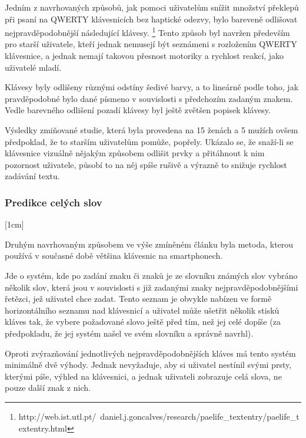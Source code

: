 \documentclass{article}
\begin{document}
Jedním z navrhovaných způsobů, jak pomoci uživatelům snížit množství překlepů při psaní na QWERTY klávesnicích bez haptické odezvy, bylo bareveně odlišovat nejpravděpodobnější následující klávesy. \footnote{http://web.ist.utl.pt/~daniel.j.goncalves/research/paelife\_textentry/paelife\_textentry.html} Tento způsob byl navržen především pro starší uživatele, kteří jednak nemusejí být seznámeni s rozložením QWERTY klávesnice, a jednak nemají takovou přesnost motoriky a rychlost reakcí, jako uživatelé mladí. 

Klávesy byly odlišeny různými odstíny šedivé barvy, a to lineárně podle toho, jak pravděpodobné bylo dané písmeno v souvislosti s předchozím zadaným znakem. Vedle barevného odlišení pozadí klávesy byl ještě zvětšen popisek klávesy.


Výsledky zmiňované studie, která byla provedena na 15 ženách a 5 mužích ovšem předpoklad, že to starším uživatelům pomůže, popřely. Ukázalo se, že snaží-li se klávesnice vizuálně nějakým způsobem odlišit prvky a přitáhnout k nim pozornost uživatele, působí to na něj spíše rušivě a výrazně to snižuje rychlost zadávání textu. 

\subsubsection{Predikce celých slov}

[1cm]

Druhým navrhovaným způsobem ve výše zmíněném článku byla metoda, kterou používá v současné době většina klávesnic na smartphonech. 

Jde o systém, kde po zadání znaku či znaků je ze slovníku známých slov vybráno několik slov, která jsou v souvislosti s již zadanými znaky nejpravděpodobnějšími řetězci, jež uživatel chce zadat. Tento seznam je obvykle nabízen ve formě horizontálního seznamu nad klávesnicí a uživatel může ušetřit několik stisků kláves tak, že vybere požadované slovo ještě před tím, než jej celé dopíše (za předpokladu, že jej systém našel ve svém slovníku a správně navrhl). 

Oproti zvýrazňování jednotlivých nejpravděpodobnějších kláves má tento systém minimálně dvě výhody. Jednak nevyžaduje, aby si uživatel nestínil svými prsty, kterými píše, výhled na klávesnici, a jednak uživateli zobrazuje celá slova, ne pouze další znak z nich. %
\end{document}
